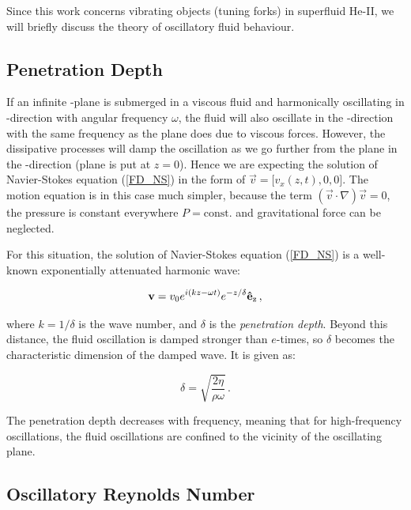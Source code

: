 Since this work concerns vibrating objects (tuning forks) in superfluid He-II, we will briefly discuss the theory of oscillatory fluid behaviour.

\subsection*{Penetration Depth} 

If an infinite -plane is submerged in a viscous fluid and harmonically oscillating in -direction with angular frequency $\omega$, the fluid will also oscillate in the -direction with the same frequency as the plane does due to viscous forces. However, the dissipative processes will damp the oscillation as we go further from the plane in the -direction (plane is put at $z=0$). Hence we are expecting the solution of Navier-Stokes equation (\ref{FD_NS}) in the
form of $ \vec{v} = \big[ v_x(z,t), 0, 0 \big] $. The motion equation is in this case much simpler, because the term $ (\vec{v}\cdot \nabla)\vec{v} = 0 $, the pressure is constant everywhere $ P=\text{const.} $ and gravitational force
can be neglected. 

\newpage

For this situation, the solution of Navier-Stokes equation (\ref{FD_NS}) is a well-known exponentially attenuated harmonic wave:

\begin{equation}
\mathbf{v} = v_0 e^{i(kz - \omega t)} e^{-z/\delta} \mathbf{\hat{e}}_{\mathrm{z}}\,,
\label{v_pen}
\end{equation}

where $k = 1/\delta$ is the wave number, and $\delta$ is the \textit{penetration depth}. Beyond this distance, the fluid oscillation is damped stronger than $e$-times, so $ \delta $ becomes the characteristic dimension of the damped wave. It is given as\cite{landau}:

\begin{equation}
\delta = \sqrt{\frac{2\eta}{\rho \omega}}\,.
\label{penetration}
\end{equation}

The penetration depth decreases with frequency, meaning that for high-frequency oscillations, the fluid oscillations are confined to the vicinity of the oscillating plane.

\subsection*{Oscillatory Reynolds Number}

